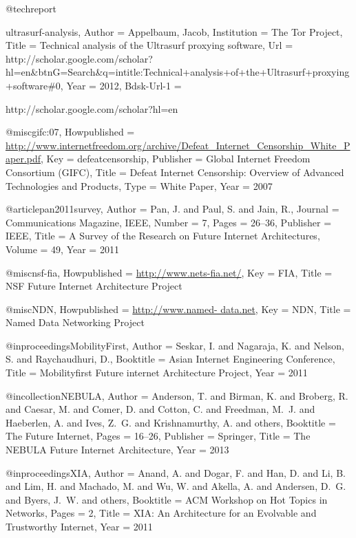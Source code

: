 {{{{{	@techreport{ultrasurf-analysis,
	Author = {Appelbaum, Jacob},
	Institution = {The Tor Project},
	Title = {{Technical analysis of the Ultrasurf proxying software}},
	Url = {http://scholar.google.com/scholar?hl=en\&btnG=Search\&q=intitle:Technical+analysis+of+the+Ultrasurf+proxying+software\#0},
	Year = {2012},
	Bdsk-Url-1 = {http://scholar.google.com/scholar?hl=en%
	
	@misc{gifc:07,
	Howpublished = {\url{http://www.internetfreedom.org/archive/Defeat\_Internet\_Censorship\_White\_Paper.pdf}},
	Key = {defeatcensorship},
	Publisher = {Global Internet Freedom Consortium (GIFC)},
	Title = {{Defeat Internet Censorship: Overview of Advanced Technologies and Products}},
	Type = {White Paper},
	Year = {2007}}
	
	@article{pan2011survey,
	Author = {Pan, J. and Paul, S. and Jain, R.},
	Journal = {Communications Magazine, IEEE},
	Number = {7},
	Pages = {26--36},
	Publisher = {IEEE},
	Title = {{A Survey of the Research on Future Internet Architectures}},
	Volume = {49},
	Year = {2011}}
	
	@misc{nsf-fia,
	Howpublished = {\url{http://www.nets-fia.net/}},
	Key = {FIA},
	Title = {{NSF Future Internet Architecture Project}}}
	
	@misc{NDN,
	Howpublished = {\url{http://www.named- data.net}},
	Key = {NDN},
	Title = {{Named Data Networking Project}}}
	
	@inproceedings{MobilityFirst,
	Author = {Seskar, I. and Nagaraja, K. and Nelson, S. and Raychaudhuri, D.},
	Booktitle = {Asian Internet Engineering Conference},
	Title = {{Mobilityfirst Future internet Architecture Project}},
	Year = {2011}}
	
	@incollection{NEBULA,
	Author = {Anderson, T. and Birman, K. and Broberg, R. and Caesar, M. and Comer, D. and Cotton, C. and Freedman, M.~J. and Haeberlen, A. and Ives, Z.~G. and Krishnamurthy, A. and others},
	Booktitle = {The Future Internet},
	Pages = {16--26},
	Publisher = {Springer},
	Title = {{The NEBULA Future Internet Architecture}},
	Year = {2013}}
	
	@inproceedings{XIA,
	Author = {Anand, A. and Dogar, F. and Han, D. and Li, B. and Lim, H. and Machado, M. and Wu, W. and Akella, A. and Andersen, D.~G. and Byers, J.~W. and others},
	Booktitle = {ACM Workshop on Hot Topics in Networks},
	Pages = {2},
	Title = {{XIA: An Architecture for an Evolvable and Trustworthy Internet}},
	Year = {2011}}
	
}}}}}}}
